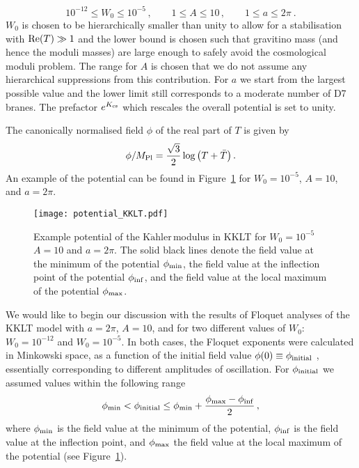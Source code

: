 \documentclass[12pt]{article}
\newcommand{\be}{\begin{equation}}
\newcommand{\ee}{\end{equation}}
\newcommand{\Kahler}{\ensuremath{\text{K}\ddot{\text{a}}\text{hler}\,}}
\begin{document}
\be
10^{-12} \le W_0 \le 10^{-5}\,,\qquad 1\le A \le 10\,,\qquad 1\le a \le 2\pi~.
\ee
$W_0$ is chosen to be hierarchically smaller than unity to allow for a stabilisation with ${\rm Re}(T)\gg 1$ and the lower bound is chosen such that gravitino mass (and hence the moduli masses) are large enough to safely avoid the cosmological moduli problem. The range for $A$ is chosen that we do not assume any hierarchical suppressions from this contribution. For $a$ we start from the largest possible value and the lower limit still corresponds to a moderate number of D7 branes. The prefactor $e^{K_{\rm cs}}$ which rescales the overall potential is set to unity.

The canonically normalised field $\phi$ of the real part of $T$ is given by
\begin{equation}
\phi/M_{\rm Pl}=\frac{\sqrt{3}}{2}\log{\left(T+\bar{T}\right)}\,.
\end{equation}
An example of the potential can be found in Figure~\ref{fig:KKLT_potential} for  $W_0=10^{-5}$, $A=10$, and $a=2\pi$.



\begin{figure}
\centering
\texttt{[image: potential\_KKLT.pdf]}
\caption{ Example potential of the \Kahler modulus in KKLT for $W_0=10^{-5}$ $A=10$ and $a=2\pi$. The solid black lines denote the field value at the minimum of the potential $\phi_{\rm min}$, the field value at the inflection point of the potential $\phi_{\rm inf}$, and the field value at the local maximum of the potential $\phi_{\rm max}$.}
\label{fig:KKLT_potential}
\end{figure}

We would like to begin our discussion with the results of Floquet analyses of the KKLT model with $a=2\pi$, $A=10$, and for two different values of $W_0$: $W_0=10^{-12}$ and $W_0=10^{-5}$. In both cases, the Floquet exponents were calculated in Minkowski space, as a function of the initial field value $\phi(0)\equiv\phi_{\rm initial}$ , essentially corresponding to different amplitudes of oscillation. For $\phi_{\rm initial}$ we assumed values within the following range
\be
\phi_{\rm min} < \phi_{\rm initial} \le \phi_{\rm min} + \frac{\phi_{\rm max}-\phi_{\rm inf}}{2}\,,
\ee
where $\phi_{\rm min}$ is the field value at the minimum of the potential, $\phi_{\rm inf}$ is the field value at the inflection point, and $\phi_{\rm max}$ the field value at the local maximum of the potential (see Figure~\ref{fig:KKLT_potential}).
\end{document}
